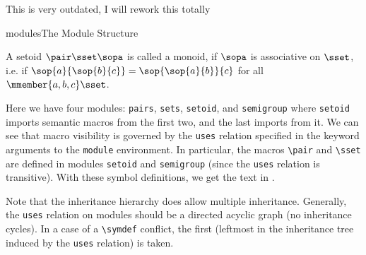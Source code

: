 \begin{oldpart}{This is very outdated, I will rework this totally}
\begin{myfig}{modules}{The Module Structure}\footnotesize
\begin{boxedverbatim}



\begin{module}[id=semigroup,uses=setoid]
  \begin{definition}[id=setoid-def]
    A setoid $\pair\sset\sopa$ is called a monoid, if $\sopa$ is associative on
    $\sset$, i.e. if $\sop{a}{\sop{b}{c}}=\sop{\sop{a}{b}}{c}$ for all
    $\mmember{a,b,c}\sset$.
  \end{definition}
\end{module}
\end{boxedverbatim}
\end{myfig}

Here we have four modules: {\tt{pairs}}, {\tt{sets}}, {\tt{setoid}}, and {\tt{semigroup}}
where {\tt{setoid}} imports semantic macros from the first two, and the last imports from
it. We can see that macro visibility is governed by the {\tt{uses}} relation specified in
the keyword arguments to the {\tt{module}} environment. In particular, the macros
{\verb|\pair|} and {\verb|\sset|} are defined in modules {\tt{setoid}} and
{\tt{semigroup}} (since the {\tt{uses}} relation is transitive). With these symbol
definitions, we get the text in {}.

Note that the inheritance hierarchy does allow multiple inheritance. Generally, the
{\tt{uses}} relation on modules should be a directed acyclic graph (no inheritance
cycles). In a case of a {\verb|\symdef|} conflict, the first (leftmost in the inheritance
tree induced by the {\tt{uses}} relation) is taken.


\end{oldpart}
